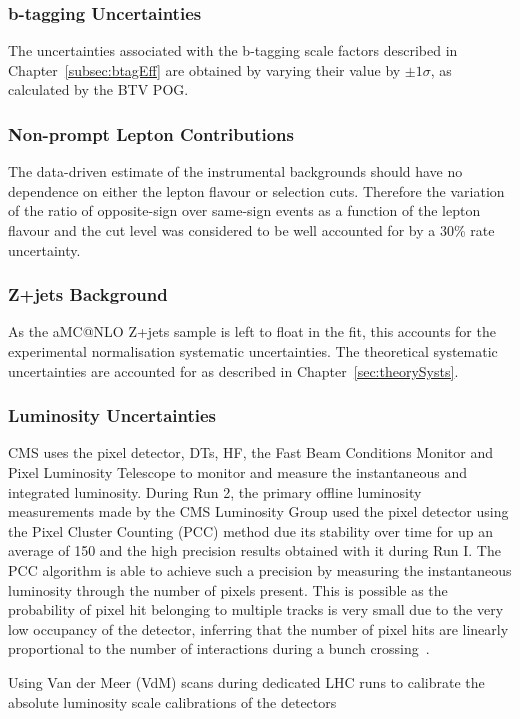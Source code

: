 \subsubsection{b-tagging Uncertainties}
The uncertainties associated with the b-tagging scale factors described in Chapter~\ref{subsec:btagEff} are obtained by varying their value by $\pm 1\sigma$, as calculated by the BTV POG.

\subsubsection{Non-prompt Lepton Contributions}
The data-driven estimate of the instrumental backgrounds should have no dependence on either the lepton flavour or selection cuts.
Therefore the variation of the ratio of opposite-sign over same-sign events as a function of the lepton flavour and the cut level was considered to be well accounted for by a 30\% rate uncertainty.

\subsubsection{Z+jets Background}
As the aMC@NLO Z+jets sample is left to float in the fit, this accounts for the experimental normalisation systematic uncertainties.
The theoretical systematic uncertainties are accounted for as described in Chapter~\ref{sec:theorySysts}.

\subsubsection{Luminosity Uncertainties}
CMS uses the pixel detector, DTs, HF, the Fast Beam Conditions Monitor and Pixel Luminosity Telescope to monitor and measure the instantaneous and integrated luminosity.
During Run 2, the primary offline luminosity measurements made by the CMS Luminosity Group used the pixel detector using the Pixel Cluster Counting (PCC) method due its stability over time for up an average \PU of 150 and the high precision results obtained with it during Run I.
The PCC algorithm is able to achieve such a precision by measuring the instantaneous luminosity through the number of pixels present. 
This is possible as the probability of pixel hit belonging to multiple tracks is very small due to the very low occupancy of the detector, inferring that the number of pixel hits are linearly proportional to the number of interactions during a bunch crossing~\cite{CMS:2017_lumi}.

Using Van der Meer (VdM) scans during dedicated LHC runs to calibrate the absolute luminosity scale calibrations of the detectors~\cite{vanderMeer:1968zz}


